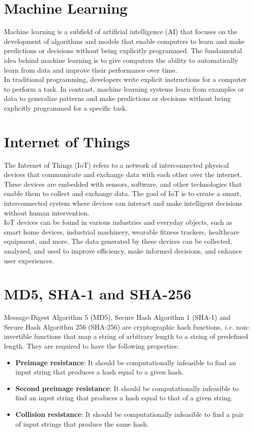 \section{Machine Learning}
Machine learning is a subfield of artificial intelligence (AI) that focuses on the development of algorithms and models that enable computers to learn and make predictions or decisions without being explicitly programmed. The fundamental idea behind machine learning is to give computers the ability to automatically learn from data and improve their performance over time. \\
In traditional programming, developers write explicit instructions for a computer to perform a task. In contrast, machine learning systems learn from examples or data to generalize patterns and make predictions or decisions without being explicitly programmed for a specific task.

\section{Internet of Things}
The Internet of Things (IoT) refers to a network of interconnected physical devices that communicate and exchange data with each other over the internet. These devices are embedded with sensors, software, and other technologies that enable them to collect and exchange data. The goal of IoT is to create a smart, interconnected system where devices can interact and make intelligent decisions without human intervention. \\
IoT devices can be found in various industries and everyday objects, such as smart home devices, industrial machinery, wearable fitness trackers, healthcare equipment, and more. The data generated by these devices can be collected, analyzed, and used to improve efficiency, make informed decisions, and enhance user experiences.

\section{MD5, SHA-1 and SHA-256}\label{ch:SHA}
Message-Digest Algorithm 5 (MD5), Secure Hash Algorithm 1 (SHA-1) and Secure Hash Algorithm 256 (SHA-256) are cryptographic hash functions, \textit{i.e.} non-invertible functions that map a string of arbitrary length to a string of predefined length. They are required to have the following properties:

\begin{itemize}
    \item \textbf{Preimage resistance}: It should be computationally infeasible to find an input string that produces a hash equal to a given hash.
    \item \textbf{Second preimage resistance}: It should be computationally infeasible to find an input string that produces a hash equal to that of a given string.
    \item \textbf{Collision resistance}: It should be computationally infeasible to find a pair of input strings that produce the same hash.
\end{itemize}

